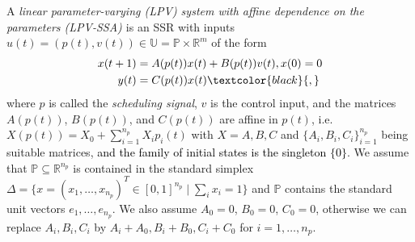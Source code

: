 \documentclass[journal,twoside,web]{ieeecolor}
\newcommand{\QNUM}{D}
\begin{document}
%
 
 A \emph{linear parameter-varying (LPV) system with affine dependence on the parameters (LPV-SSA) \cite{Toth1}} is an SSR
 with inputs $u(t)=(p(t),v(t)) \in \mathbb{U}=\mathbb{P} \times \mathbb{R}^m$ of the form
\begin{equation}
\label{eq1:lpv}
\begin{split}
x(t+1) & = A(p(t)) x(t) + B(p(t)) v(t), x(0)=0\\
y(t) &= C(p(t))x(t) \textcolor{black}{,}
\end{split}
\end{equation}
where $p$ is called the \emph{scheduling signal}, $v$ is the control input, and 
the matrices $A(p(t))$, $B(p(t))$, and $C(p(t))$ are affine in $p(t)$, i.e.
\(
   X(p(t)) = X_0 + \sum_{i=1}^{n_p} X_i p_i(t)
\)
with $X = A, B, C$ and $\{A_i, B_i, C_i\}_{i=1}^{n_p}$ being suitable matrices,
\textcolor{black}{and the family of initial states is the singleton $\{0\}$}.
We assume that $\mathbb{P} \subseteq \mathbb{R}^{n_p}$ is contained in the standard simplex $\Delta = \{x = (x_1, \ldots, x_{n_p})^T \in [0,1]^{n_p} \mid \sum_i x_i = 1\}$
and $\mathbb{P}$ contains the standard unit vectors $e_1, \ldots, e_{n_p}$.
We also assume $A_0 = 0$, $B_0 = 0$, $C_0 = 0$, otherwise we can replace $A_i, B_i, C_i$ by $A_i + A_0, B_i + B_0, C_i + C_0$ for $i = 1, \ldots, n_p$.
\end{document}

